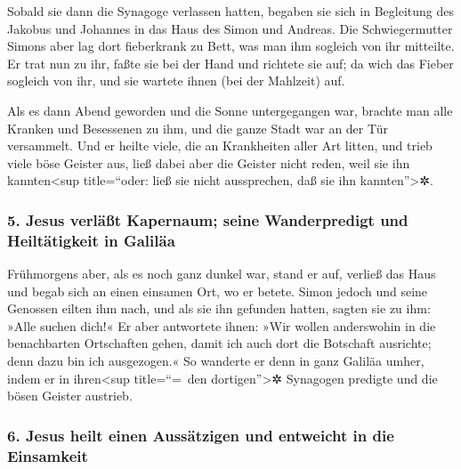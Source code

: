  Sobald sie dann die Synagoge verlassen hatten, begaben
sie sich in Begleitung des Jakobus und Johannes in das Haus des Simon
und Andreas.  Die Schwiegermutter Simons aber lag dort
fieberkrank zu Bett, was man ihm sogleich von ihr mitteilte.
 Er trat nun zu ihr, faßte sie bei der Hand und richtete
sie auf; da wich das Fieber sogleich von ihr, und sie wartete ihnen (bei
der Mahlzeit) auf.

 Als es dann Abend geworden und die Sonne untergegangen
war, brachte man alle Kranken und Besessenen zu ihm,  und
die ganze Stadt war an der Tür versammelt.  Und er heilte
viele, die an Krankheiten aller Art litten, und trieb viele böse Geister
aus, ließ dabei aber die Geister nicht reden, weil sie ihn
kannten\textless sup title=``oder: ließ sie nicht aussprechen, daß sie
ihn kannten''\textgreater✲.

\hypertarget{jesus-verluxe4uxdft-kapernaum-seine-wanderpredigt-und-heiltuxe4tigkeit-in-galiluxe4a}{%
\subsubsection{5. Jesus verläßt Kapernaum; seine Wanderpredigt und
Heiltätigkeit in
Galiläa}\label{jesus-verluxe4uxdft-kapernaum-seine-wanderpredigt-und-heiltuxe4tigkeit-in-galiluxe4a}}

 Frühmorgens aber, als es noch ganz dunkel war, stand er
auf, verließ das Haus und begab sich an einen einsamen Ort, wo er
betete.  Simon jedoch und seine Genossen eilten ihm nach,
 und als sie ihn gefunden hatten, sagten sie zu ihm:
»Alle suchen dich!«  Er aber antwortete ihnen: »Wir
wollen anderswohin in die benachbarten Ortschaften gehen, damit ich auch
dort die Botschaft ausrichte; denn dazu bin ich ausgezogen.«
 So wanderte er denn in ganz Galiläa umher, indem er in
ihren\textless sup title=``=~den dortigen''\textgreater✲ Synagogen
predigte und die bösen Geister austrieb.

\hypertarget{jesus-heilt-einen-aussuxe4tzigen-und-entweicht-in-die-einsamkeit}{%
\subsubsection{6. Jesus heilt einen Aussätzigen und entweicht in die
Einsamkeit}\label{jesus-heilt-einen-aussuxe4tzigen-und-entweicht-in-die-einsamkeit}}


